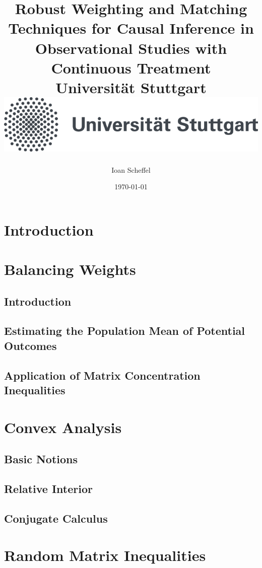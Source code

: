 \documentclass[12pt]{scrreport}
\title{
  {
    Robust Weighting and Matching Techniques for Causal Inference in Observational Studies with Continuous Treatment
  }
  \\
  {\large Universität Stuttgart}
  \\
  {\includegraphics{unistuttgart_logo_deutsch.jpg}}
}
\author{Ioan Scheffel}
\date{\today}
\begin{document}
\maketitle

\tableofcontents 

\chapter{Introduction}


\chapter{Balancing Weights}
  \section{Introduction}
  
  \section{Estimating the Population Mean of Potential Outcomes}
  \section{Application of Matrix Concentration Inequalities}
  
\chapter{Convex Analysis}
  \section{Basic Notions}
  
  \section{Relative Interior}
  
  \section{Conjugate Calculus}
  
%

\chapter{Random Matrix Inequalities}
\end{document}
